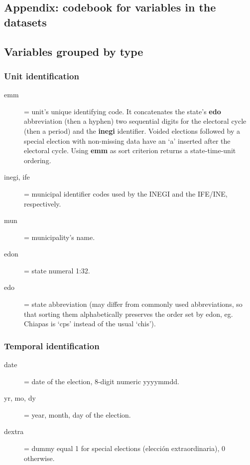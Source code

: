 \documentclass[letter,12pt]{article}
\begin{document}
\begin{singlespace}

\section{Appendix: codebook for variables in the datasets}

\subsection{Variables grouped by type}
\subsubsection{Unit identification}
\begin{description}
\item[emm] = unit's unique identifying code. It concatenates the state's \textbf{edo} abbreviation (then a hyphen) two sequential digits for the electoral cycle (then a period) and the \textbf{inegi} identifier. Voided elections followed by a special election with non-missing data have an `a' inserted after the electoral cycle. Using \textbf{emm} as sort criterion returns a state-time-unit ordering. 
\item[inegi, ife] = municipal identifier codes used by the INEGI and the IFE/INE, respectively.
\item[mun] = municipality's name.
\item[edon] = state numeral 1:32.
\item[edo] = state abbreviation (may differ from commonly used abbreviations, so that sorting them alphabetically preserves the order set by edon, eg. Chiapas is `cps' instead of the usual `chis').
\end{description}
\subsubsection{Temporal identification}
\begin{description}
\item[date] = date of the election, 8-digit numeric yyyymmdd. 
\item[yr, mo, dy] = year, month, day of the election.
\item[dextra] = dummy equal 1 for special elections (elección extraordinaria), 0 otherwise.
\end{description}

\end{singlespace}
\end{document}
